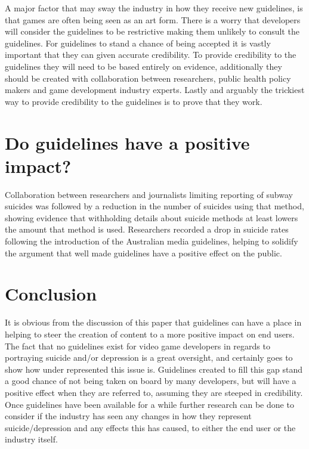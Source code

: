 \documentclass{scrartcl}
\begin{document}
		A major factor that may sway the industry in how they receive new guidelines, is that games are often being seen as an art form\cite{pearce2006games}. There is a worry that developers will consider the guidelines to be restrictive making them unlikely to consult the guidelines. For guidelines to stand a chance of being accepted it is vastly important that they can given accurate credibility. To provide credibility to the guidelines they will need to be based entirely on evidence, additionally they should be created with collaboration between researchers, public health policy makers and game development industry experts\cite{hawton2002influences}. Lastly and arguably the trickiest way to  provide credibility to the guidelines is to prove that they work.
		
	\section{Do guidelines have a positive impact?}
		Collaboration between researchers and journalists limiting reporting of subway suicides was followed by a reduction in the number of suicides using that method\cite{etzersdorfer1998preventing}, showing evidence that withholding details about suicide methods at least lowers the amount that method is used. 
		Researchers recorded a drop in suicide rates following the introduction of the Australian media guidelines\cite{niederkrotenthaler2007assessing}, helping to solidify the argument that well made guidelines have a positive effect on the public. 
	\section{Conclusion}
		It is obvious from the discussion of this paper that guidelines can have a place in helping to steer the creation of content to a more positive impact on end users. The fact that no guidelines exist for video game developers in regards to portraying suicide and/or depression is a great oversight, and certainly goes to show how under represented this issue is. 
		Guidelines created to fill this gap stand a good chance of not being taken on board by many developers, but will have a positive effect when they are referred to, assuming they are steeped in credibility. Once guidelines have been available for a while further research can be done to consider if the industry has seen any changes in how they represent suicide/depression and any effects this has caused, to either the end user or the industry itself.
		
	
	
	
\end{document}
